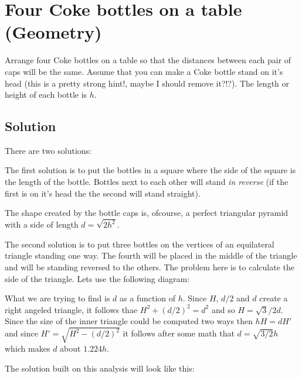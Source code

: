 \documentclass{article}
\begin{document}
\section{Four Coke bottles on a table (Geometry)}
Arrange four Coke bottles on a table so that the distances between each pair of caps will be the same. Assume that
you can make a Coke bottle stand on it's head (this is a pretty strong hint!, maybe I should remove it?!?). The length
or height of each bottle is ${h}$.

\subsection{Solution}
There are two solutions:

The first solution is to put the bottles in a square where the side of the square is the length of the bottle. Bottles
next to each other will stand \emph{in reverse} (if the first is on it's head the the second will stand straight).

\begin{center}

\end{center}

The shape created by the bottle caps is, ofcourse, a perfect triangular pyramid with a side of length $d=\sqrt{2h^2}$.

The second solution is to put three bottles on the vertices of an equilateral triangle standing one way. The fourth will be placed
in the middle of the triangle and will be standing reversed to the others. The problem here is to calculate the side of the triangle.
Lets use the following diagram:

\begin{center}

\end{center}

What we are trying to find is $d$ as a function of $h$. Since $H$, $d/2$ and $d$ create a right angeled triangle, it follows
thae $H^2+(d/2)^2=d^2$ and so $H=\sqrt{3}/2d$. Since the size of the inner triangle could be computed two ways then $hH=dH'$ and
since $H'=\sqrt{H^2-(d/2)^2}$ it follows after some math that $d=\sqrt{3/2}h$ which makes $d$ about $1.224h$.

The solution built on this analysis will look like this:

\begin{center}

\end{center}
\end{document}
